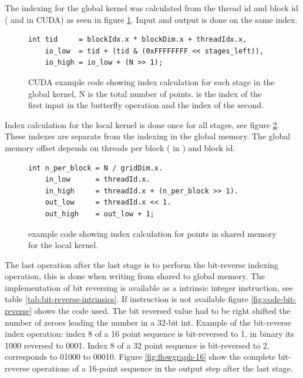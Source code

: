 The indexing for the global kernel was calculated from the thread id and block id ( and  in CUDA) as seen in figure \ref{fig:code-global-index}. Input and output is done on the same index.
\begin{figure}[htbp]
	\centering
	\lstset{language=C++}
	\begin{framed}
	\begin{lstlisting}
int tid     = blockIdx.x * blockDim.x + threadIdx.x,
    io_low  = tid + (tid & (0xFFFFFFFF << stages_left)),
    io_high = io_low + (N >> 1);
	\end{lstlisting}
	\end{framed}
	\caption{ CUDA example code showing index calculation for each stage in the global kernel, N is the total number of points.  is the index of the first input in the butterfly operation and  the index of the second.}
	\label{fig:code-global-index}
\end{figure}

Index calculation for the local kernel is done once for all stages, see figure \ref{fig:code-local-index}. These indexes are separate from the indexing in the global memory. The global memory offset depends on threads per block ( in {\CU}) and block id.
\begin{figure}[htbp]
	\centering
	\lstset{language=C++}
	\begin{framed}
	\begin{lstlisting}
int n_per_block = N / gridDim.x.
    in_low      = threadId.x.
    in_high     = threadId.x + (n_per_block >> 1).
    out_low     = threadId.x << 1.
    out_high    = out_low + 1;
	\end{lstlisting}
	\end{framed}
	\caption{ {\CU} example code showing index calculation for points in shared memory for the {\CU} local kernel. }
	\label{fig:code-local-index}
\end{figure}

The last operation after the last stage is to perform the bit-reverse indexing operation, this is done when writing from shared to global memory. The implementation of bit reversing is available as a intrinsic integer instruction, see table \ref{tab:bit-reverse-intrinsics}. If instruction is not available figure \ref{fig:code-bit-reverse} shows the code used. The bit reversed value had to be right shifted the number of zeroes leading the number in a 32-bit int. Example of the bit-reverse index operation: index 8 of a 16 point sequence is bit-reversed to 1, in binary its 1000 reversed to 0001. Index 8 of a 32 point sequence is bit-reversed to 2, corresponds to 01000 to 00010. Figure \ref{fig:flowgraph-16} show the complete bit-reverse operations of a 16-point sequence in the output step after the last stage.

